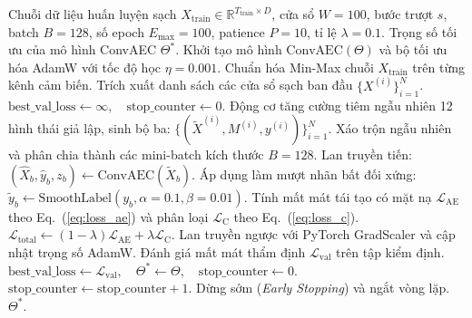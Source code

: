 \documentclass[11pt,journal,onecolumn]{IEEEtran}
\begin{document}
\begin{algorithm}[H]
\caption{Quy trình huấn luyện tự giám sát RedLamp với tăng cường bất thường giả lập}
\label{alg:training}
\begin{algorithmic}[1]
\REQUIRE Chuỗi dữ liệu huấn luyện sạch $X_{\text{train}} \in \mathbb{R}^{T_{\text{train}} \times D}$, cửa sổ $W=100$, bước trượt $s$, batch $B=128$, số epoch $E_{\text{max}}=100$, patience $P=10$, tỉ lệ $\lambda=0.1$.
\ENSURE Trọng số tối ưu của mô hình ConvAEC $\Theta^*$.
\STATE Khởi tạo mô hình $\text{ConvAEC}(\Theta)$ và bộ tối ưu hóa AdamW với tốc độ học $\eta = 0.001$.
\STATE Chuẩn hóa Min-Max chuỗi $X_{\text{train}}$ trên từng kênh cảm biến.
\STATE Trích xuất danh sách các cửa sổ sạch ban đầu $\{ X^{(i)} \}_{i=1}^N$.
\STATE $\text{best\_val\_loss} \leftarrow \infty, \quad \text{stop\_counter} \leftarrow 0$.
    \STATE Động cơ tăng cường tiêm ngẫu nhiên 12 hình thái giả lập, sinh bộ ba: $\{ (\tilde{X}^{(i)}, M^{(i)}, y^{(i)}) \}_{i=1}^N$.
    \STATE Xáo trộn ngẫu nhiên và phân chia thành các mini-batch kích thước $B = 128$.
        \STATE Lan truyền tiến: $(\hat{X}_b, \hat{y}_b, z_b) \leftarrow \text{ConvAEC}(\tilde{X}_b)$.
        \STATE Áp dụng làm mượt nhãn bất đối xứng: $\tilde{y}_b \leftarrow \text{SmoothLabel}(y_b, \alpha=0.1, \beta=0.01)$.
        \STATE Tính mất mát tái tạo có mặt nạ $\mathcal{L}_{\text{AE}}$ theo Eq.~(\ref{eq:loss_ae}) và phân loại $\mathcal{L}_{\text{C}}$ theo Eq.~(\ref{eq:loss_c}).
        \STATE $\mathcal{L}_{\text{total}} \leftarrow (1 - \lambda)\mathcal{L}_{\text{AE}} + \lambda \mathcal{L}_{\text{C}}$.
        \STATE Lan truyền ngược với PyTorch GradScaler và cập nhật trọng số AdamW.
    \ENDFOR
    \STATE Đánh giá mất mát thẩm định $\mathcal{L}_{\text{val}}$ trên tập kiểm định.
        \STATE $\text{best\_val\_loss} \leftarrow \mathcal{L}_{\text{val}}, \quad \Theta^* \leftarrow \Theta, \quad \text{stop\_counter} \leftarrow 0$.
    \ELSE
        \STATE $\text{stop\_counter} \leftarrow \text{stop\_counter} + 1$.
            \STATE Dừng sớm (\textit{Early Stopping}) và ngắt vòng lặp.
        \ENDIF
    \ENDIF
\ENDFOR
\RETURN $\Theta^*$.
\end{algorithmic}
\end{algorithm}



\end{document}
